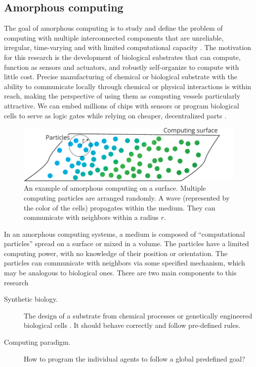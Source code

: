 \subsection{Amorphous computing}
The goal of amorphous computing is to study and define the problem of computing
with multiple interconnected components that are unreliable, irregular,
time-varying and with limited computational capacity
\parencite{abelsonAmorphousComputing2000}. The motivation for this research is
the development of biological substrates that can compute, function as sensors
and actuators, and robustly self-organize to compute with little cost. Precise
manufacturing of chemical or biological substrate with the ability to
communicate locally through chemical or physical interactions is within reach,
making the perspective of using them as computing vessels particularly
attractive. We can embed millions of chips with sensors
\parencite{abelsonAmorphousComputing2000} or program biological cells to serve
as logic gates \parencite{weissProgrammingBiologicalCells1998,
  weissVivoDigitalCircuits2002} while relying on cheaper, decentralized parts
\parencite{buteraProgrammingPaintableComputer2002}.

\begin{figure}[htbp]
  \centering
  \includegraphics[width=.8\linewidth]{figures/amorphous_computing}
  \caption{An example of amorphous computing on a surface. Multiple computing
    particles are arranged randomly. A wave (represented by the color of the
    cells) propagates within the medium. They can communicate with neighbors
    within a radius $r$.}
  \label{fig:amorphous_computing}
\end{figure}

In an amorphous computing systems, a medium is composed of ``computational
particles'' spread on a surface or mixed in a volume. The particles have a
limited computing power, with no knowledge of their position or orientation. The
particles can communicate with neighbors via some specified mechanism, which may
be analogous to biological ones. There are two main components to this research
\begin{description}
  \item[Synthetic biology.] The design of a substrate from chemical processes or
        genetically engineered biological cells
        \parencite{weissVivoDigitalCircuits2002}. It should behave correctly and
        follow pre-defined rules.
  \item[Computing paradigm.] How to program the individual agents to follow a
        global predefined goal?
        \parencite{nagpalProgrammableSelfassemblyConstructing2001}
\end{description}


